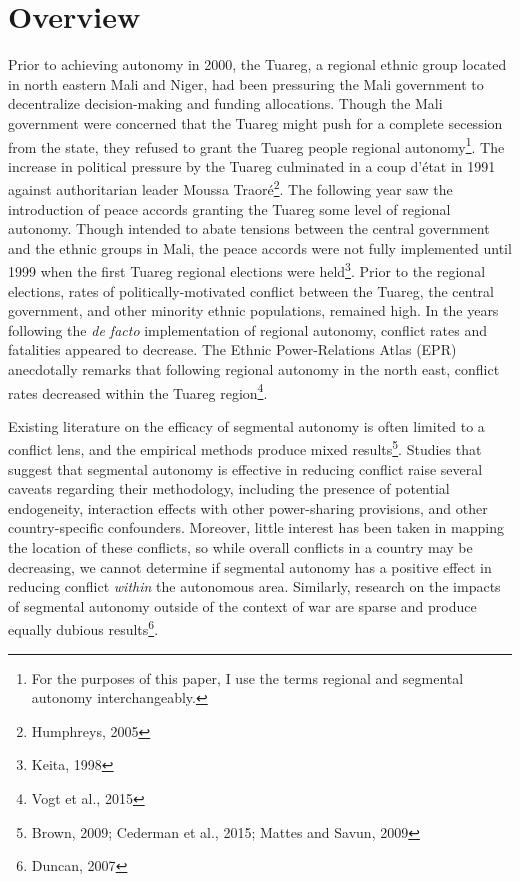 \documentclass[12pt]{article}
\begin{document}





\section{Overview}

Prior to achieving autonomy in 2000, the Tuareg, a regional ethnic group located in north eastern Mali and Niger, had been pressuring the Mali government to decentralize decision-making and funding allocations. Though the Mali government were concerned that the Tuareg might push for a complete secession from the state, they refused to grant the Tuareg people regional autonomy\footnote{For the purposes of this paper, I use the terms regional and segmental autonomy interchangeably.}. The increase in political pressure by the Tuareg culminated in a coup d’état in 1991 against authoritarian leader Moussa Traoré\footnote{Humphreys, 2005}. The following year saw the introduction of peace accords granting the Tuareg some level of regional autonomy. Though intended to abate tensions between the central government and the ethnic groups in Mali, the peace accords were not fully implemented until 1999 when the first Tuareg regional elections were held\footnote{Keita, 1998}. Prior to the regional elections, rates of politically-motivated conflict between the Tuareg, the central government, and other minority ethnic populations, remained high. In the years following the \textit{de facto} implementation of regional autonomy, conflict rates and fatalities appeared to decrease. The Ethnic Power-Relations Atlas (EPR) anecdotally remarks that following regional autonomy in the north east, conflict rates decreased within the Tuareg region\footnote{Vogt et al., 2015}.

Existing literature on the efficacy of segmental autonomy is often limited to a conflict lens, and the empirical methods produce mixed results\footnote{Brown, 2009; Cederman et al., 2015; Mattes and Savun, 2009}. Studies that suggest that segmental autonomy is effective in reducing conflict raise several caveats regarding their methodology, including the presence of potential endogeneity, interaction effects with other power-sharing provisions, and other country-specific confounders. Moreover, little interest has been taken in mapping the location of these conflicts, so while overall conflicts in a country may be decreasing, we cannot determine if segmental autonomy has a positive effect in reducing conflict \textit{within} the autonomous area. Similarly, research on the impacts of segmental autonomy outside of the context of war are sparse and produce equally dubious results\footnote{Duncan, 2007}. 
\end{document}
